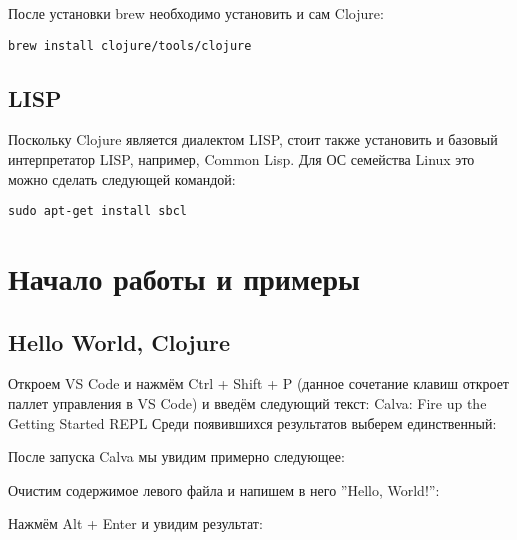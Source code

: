 После установки brew необходимо установить и сам Clojure:

\begin{center}
	\captionsetup{justification=raggedright,singlelinecheck=off}
	\begin{lstlisting}[label=lst:brewclojure,caption=Установка Clojure]
brew install clojure/tools/clojure
	\end{lstlisting}
\end{center}

\section*{LISP}

Поскольку Clojure является диалектом LISP, стоит также установить и базовый интерпретатор LISP,  например, Common Lisp.
Для ОС семейства Linux это можно сделать следующей командой:

\begin{center}
	\captionsetup{justification=raggedright,singlelinecheck=off}
	\begin{lstlisting}[label=lst:brewclojure,caption=Установка Common Lisp]
sudo apt-get install sbcl
	\end{lstlisting}
\end{center}


\chapter*{Начало работы и примеры}

\section*{Hello World, Clojure}

Откроем VS Code и нажмём Ctrl + Shift + P (данное сочетание клавиш откроет паллет управления в VS Code) и введём следующий текст: Calva: Fire up the Getting Started REPL
Среди появившихся результатов выберем единственный:


После запуска Calva мы увидим примерно следующее:


Очистим содержимое левого файла и напишем в него ''Hello, World!'':


Нажмём Alt + Enter и увидим результат:

